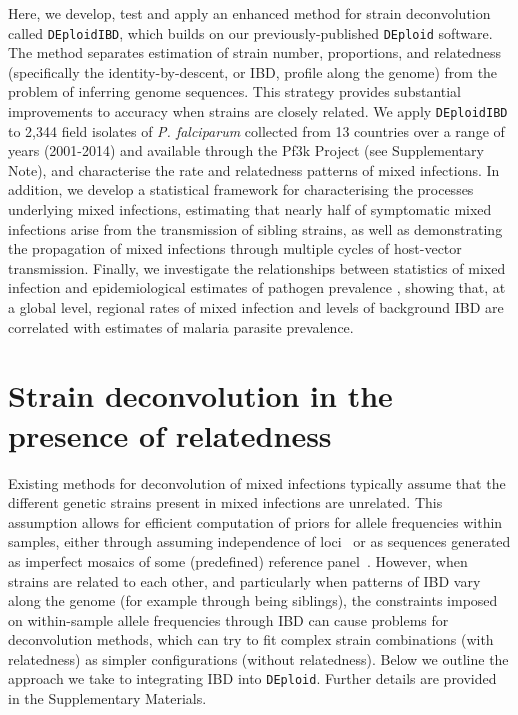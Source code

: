 \documentclass[9pt,lineno]{elife}
\begin{document}
Here, we develop, test and apply an enhanced method for strain deconvolution called \texttt{DEploidIBD}, which builds on our previously-published \texttt{DEploid} software.  The method separates estimation of strain number, proportions, and relatedness (specifically the identity-by-descent, or IBD, profile along the genome) from the problem of inferring genome sequences. This strategy provides substantial improvements to accuracy when strains are closely related.  We apply \texttt{DEploidIBD} to 2,344 field isolates of {\it P. falciparum} collected from 13 countries over a range of years (2001-2014) and available through the Pf3k Project (see Supplementary Note), and characterise the rate and relatedness patterns of mixed infections.  In addition, we develop a statistical framework for characterising the processes underlying mixed infections, estimating that nearly half of symptomatic mixed infections arise from the transmission of sibling strains, as well as demonstrating the propagation of mixed infections through multiple cycles of host-vector transmission.  Finally, we investigate the relationships between statistics of mixed infection and epidemiological estimates of pathogen prevalence \citep{MAP2017}, showing that, at a global level, regional rates of mixed infection and levels of background IBD are correlated with estimates of malaria parasite prevalence.

\section{Strain deconvolution in the presence of relatedness}

Existing methods for deconvolution of mixed infections typically assume that the different genetic strains present in mixed infections are unrelated.  This assumption allows for efficient computation of priors for allele frequencies within samples, either through assuming independence of loci~\citep{Jack2016} or as sequences generated as imperfect mosaics of some (predefined) reference panel~\citep{Zhu2017}.  However, when strains are related to each other, and particularly when patterns of IBD vary along the genome (for example through being siblings), the constraints imposed on within-sample allele frequencies through IBD can cause problems for deconvolution methods, which can try to fit complex strain combinations (with relatedness) as simpler configurations (without relatedness).  Below we outline the approach we take to integrating IBD into \texttt{DEploid}.  Further details are provided in the Supplementary Materials.
\end{document}
